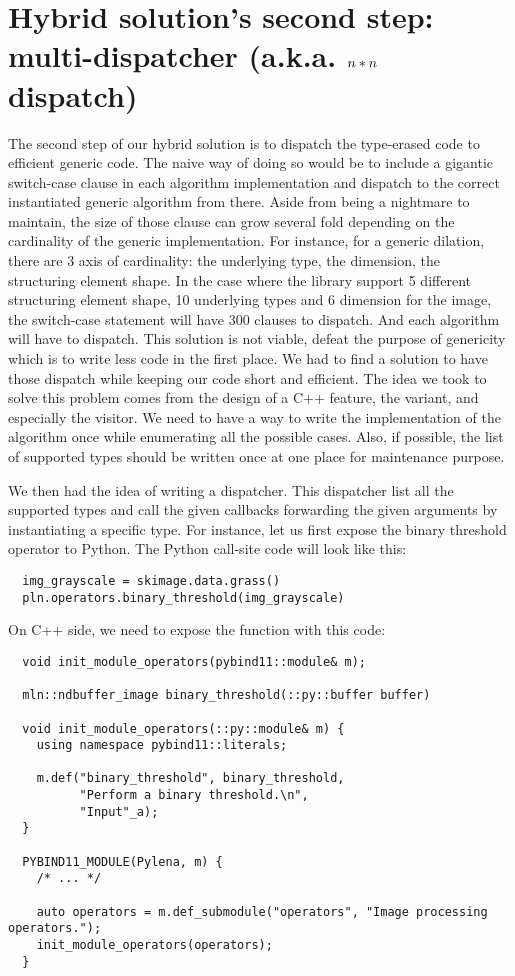 \section{Hybrid solution's second step: multi-dispatcher (a.k.a. $\protect n*n$ dispatch)}

The second step of our hybrid solution is to dispatch the type-erased code to efficient generic code. The naive way of
doing so would be to include a gigantic switch-case clause in each algorithm implementation and dispatch to the correct
instantiated generic algorithm from there. Aside from being a nightmare to maintain, the size of those clause can grow
several fold depending on the cardinality of the generic implementation. For instance, for a generic dilation, there are
3 axis of cardinality: the underlying type, the dimension, the structuring element shape. In the case where the library
support 5 different structuring element shape, 10 underlying types and 6 dimension for the image, the switch-case
statement will have 300 clauses to dispatch. And each algorithm will have to dispatch. This solution is not viable,
defeat the purpose of genericity which is to write less code in the first place. We had to find a solution to have those
dispatch while keeping our code short and efficient. The idea we took to solve this problem comes from the design of a
C++ feature, the variant, and especially the visitor. We need to have a way to write the implementation of the algorithm
once while enumerating all the possible cases. Also, if possible, the list of supported types should be written once at
one place for maintenance purpose.

We then had the idea of writing a dispatcher. This dispatcher list all the supported types and call the given callbacks
forwarding the given arguments by instantiating a specific type. For instance, let us first expose the binary threshold
operator to Python. The Python call-site code will look like this:

\begin{verbatim}
  img_grayscale = skimage.data.grass()
  pln.operators.binary_threshold(img_grayscale)
\end{verbatim}

On C++ side, we need to expose the function with this code:
\begin{verbatim}
  void init_module_operators(pybind11::module& m);

  mln::ndbuffer_image binary_threshold(::py::buffer buffer)

  void init_module_operators(::py::module& m) {
    using namespace pybind11::literals;

    m.def("binary_threshold", binary_threshold,
          "Perform a binary threshold.\n",
          "Input"_a);
  }

  PYBIND11_MODULE(Pylena, m) {
    /* ... */

    auto operators = m.def_submodule("operators", "Image processing operators.");
    init_module_operators(operators);
  }
\end{verbatim}

